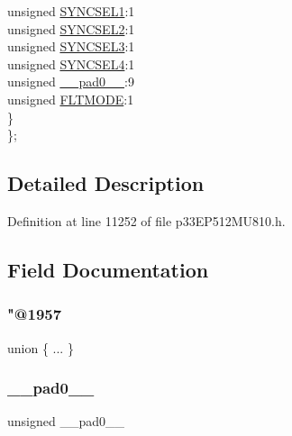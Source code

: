 \begin{DoxyCompactItemize}
\begin{tabbing}
\>\>unsigned \hyperlink{structtag_o_c3_c_o_n2_b_i_t_s_a50e73f95ab1c258ddc64f69c0991deaf}{SYNCSEL1}:1\\
\>\>unsigned \hyperlink{structtag_o_c3_c_o_n2_b_i_t_s_a304907a5d2c4cbf1114a54642a85951e}{SYNCSEL2}:1\\
\>\>unsigned \hyperlink{structtag_o_c3_c_o_n2_b_i_t_s_a6bbd1bd2ead6c9fa713969c6eb0f0c75}{SYNCSEL3}:1\\
\>\>unsigned \hyperlink{structtag_o_c3_c_o_n2_b_i_t_s_a0cd5bbe196c7974953909d27a6307bb7}{SYNCSEL4}:1\\
\>\>unsigned \hyperlink{structtag_o_c3_c_o_n2_b_i_t_s_adf71f3d8410c1f1dbbc96680a92c49af}{\_\_pad0\_\_}:9\\
\>\>unsigned \hyperlink{structtag_o_c3_c_o_n2_b_i_t_s_ad53c2a5303780172219bfd5e0100c782}{FLTMODE}:1\\
\>\} \\
\}; \\

\end{tabbing}\end{DoxyCompactItemize}


\subsection{Detailed Description}


Definition at line 11252 of file p33\+E\+P512\+M\+U810.\+h.



\subsection{Field Documentation}
\mbox{\label{structtag_o_c3_c_o_n2_b_i_t_s_aac637e7a7d03898d82b78c4b05999c88}} 
\subsubsection{\texorpdfstring{"@1957}{@1957}}
{\footnotesize\ttfamily union \{ ... \} }

\mbox{\label{structtag_o_c3_c_o_n2_b_i_t_s_adf71f3d8410c1f1dbbc96680a92c49af}} 
\subsubsection{\texorpdfstring{\+\_\+\+\_\+pad0\+\_\+\+\_\+}{\_\_pad0\_\_}}
{\footnotesize\ttfamily unsigned \+\_\+\+\_\+pad0\+\_\+\+\_\+}



